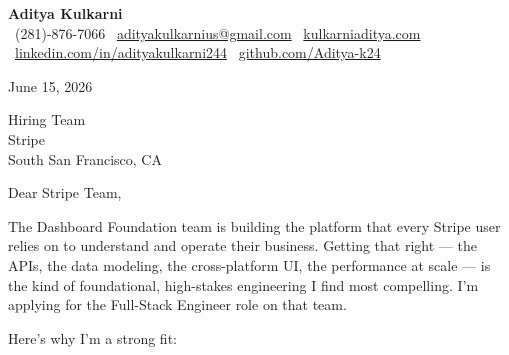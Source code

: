 \documentclass[11pt]{article}
\begin{document}
\begin{center}
  {\LARGE \textbf{Aditya Kulkarni}} \\[4pt]
  \small
  \faPhone\ (281)-876-7066 \quad
  \faEnvelope\ \href{mailto:adityakulkarnius@gmail.com}{adityakulkarnius@gmail.com} \quad
  \faGlobe\ \href{https://www.kulkarniaditya.com}{kulkarniaditya.com} \quad
  \faLinkedin\ \href{https://www.linkedin.com/in/adityakulkarni244/}{linkedin.com/in/adityakulkarni244} \quad
  \faGithub\ \href{https://github.com/Aditya-k24}{github.com/Aditya-k24}
\end{center}

\vspace{6pt}

June 15, 2026

\vspace{6pt}

Hiring Team \\
Stripe \\
South San Francisco, CA

\vspace{10pt}

Dear Stripe Team,

\vspace{6pt}

The Dashboard Foundation team is building the platform that every Stripe user relies on to understand and operate their business. Getting that right — the APIs, the data modeling, the cross-platform UI, the performance at scale — is the kind of foundational, high-stakes engineering I find most compelling. I'm applying for the Full-Stack Engineer role on that team.

\vspace{8pt}

Here's why I'm a strong fit:
\end{document}

